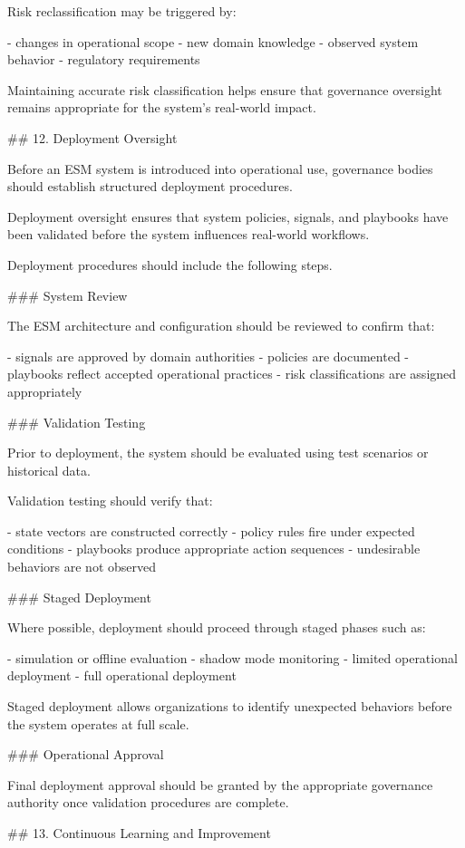 Risk reclassification may be triggered by:

- changes in operational scope
- new domain knowledge
- observed system behavior
- regulatory requirements

Maintaining accurate risk classification helps ensure that governance oversight remains appropriate for the system's real-world impact.

## 12. Deployment Oversight

Before an ESM system is introduced into operational use, governance bodies should establish structured deployment procedures.

Deployment oversight ensures that system policies, signals, and playbooks have been validated before the system influences real-world workflows.

Deployment procedures should include the following steps.

### System Review

The ESM architecture and configuration should be reviewed to confirm that:

- signals are approved by domain authorities
- policies are documented
- playbooks reflect accepted operational practices
- risk classifications are assigned appropriately

### Validation Testing

Prior to deployment, the system should be evaluated using test scenarios or historical data.

Validation testing should verify that:

- state vectors are constructed correctly
- policy rules fire under expected conditions
- playbooks produce appropriate action sequences
- undesirable behaviors are not observed

### Staged Deployment

Where possible, deployment should proceed through staged phases such as:

- simulation or offline evaluation
- shadow mode monitoring
- limited operational deployment
- full operational deployment

Staged deployment allows organizations to identify unexpected behaviors before the system operates at full scale.

### Operational Approval

Final deployment approval should be granted by the appropriate governance authority once validation procedures are complete.

## 13. Continuous Learning and Improvement


